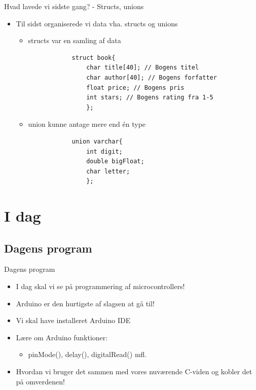 \documentclass{beamer}
\begin{document}
\begin{frame}[fragile]{Hvad lavede vi sidste gang? - Structs, unions}
	\begin{itemize}
		\item{Til sidst organiserede vi data vha. {\color{C_darkblue}structs} og {\color{C_darkblue}unions}}
		\begin{itemize}
			\item{{\color{C_darkblue}structs} var en samling af data}
			\begin{lstlisting}
			struct book{
				char title[40]; // Bogens titel
				char author[40]; // Bogens forfatter
				float price; // Bogens pris
				int stars; // Bogens rating fra 1-5
				};
			\end{lstlisting}
			\item{{\color{C_darkblue}union} kunne antage mere end én type}
			\begin{lstlisting}
			union varchar{
				int digit;
				double bigFloat;
				char letter;
				};
			\end{lstlisting}
		\end{itemize}
	\end{itemize}
\end{frame}

\section{I dag}
\subsection{Dagens program}

\begin{frame}[fragile]{Dagens program}
\begin{itemize}
	\item{I dag skal vi se på programmering af microcontrollers!}
	\item{Arduino er den hurtigste af slagsen at gå til!}
	\item{Vi skal have installeret {\color{arduinoBlue}Arduino IDE}}
	\item{Lære om {\color{arduinoBlue}Arduino} funktioner:}
	\begin{itemize}
		\item{{\color{arduinoOrange}pinMode}(), {\color{arduinoOrange}delay}(), {\color{arduinoOrange}digitalRead}() mfl.}
	\end{itemize}
	\item{Hvordan vi bruger det sammen med vores nuværende C-viden og kobler det på omverdenen!}
\end{itemize}
\end{frame}
\end{document}
